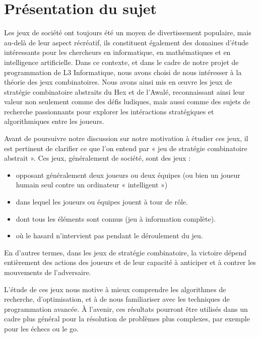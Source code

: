 \section{Présentation du sujet}
Les jeux de société ont toujours été un moyen de divertissement populaire, mais au-delà 
de leur aspect récréatif, ils constituent également des domaines d'étude intéressants pour les 
chercheurs en informatique, en mathématiques et en intelligence artificielle. 
Dans ce contexte, et dans le cadre de notre projet de programmation de L3 Informatique, 
nous avons choisi de nous intéresser à la théorie des jeux combinatoires. Nous avons ainsi mis 
en œuvre les jeux de stratégie combinatoire abstraits du Hex et de l'Awalé, reconnaissant ainsi 
leur valeur non seulement comme des défis ludiques, mais aussi comme des sujets de recherche 
passionnants pour explorer les intéractions stratégiques et algorithmiques entre les joueurs.

Avant de poursuivre notre discussion sur notre motivation à étudier ces jeux, il est pertinent
de clarifier ce que l'on entend par « jeu de stratégie combinatoire abstrait ». Ces jeux, généralement de société, sont des jeux :
\begin{itemize}
	\item opposant généralement deux joueurs ou deux équipes (ou bien un joueur humain seul 
	contre un ordinateur « intelligent »)
	\item dans lequel les joueurs ou équipes jouent à tour de rôle.
	\item dont tous les éléments sont connus (jeu à information complète).
	\item où le hasard n'intervient pas pendant le déroulement du jeu.
\end{itemize}
En d'autres termes, dans les jeux de stratégie combinatoire, la victoire dépend entièrement 
des actions des joueurs et de leur capacité à anticiper et à contrer les mouvements de l'adversaire. 


L'étude de ces jeux nous motive à mieux comprendre les algorithmes de 
recherche, d'optimisation, et à de nous familiariser avec les techniques de 
programmation avancée. À l'avenir, ces résultats pourront être utilisés dans
un cadre plus général pour la résolution de problèmes plus complexes, par exemple
pour les échecs ou le go. 


